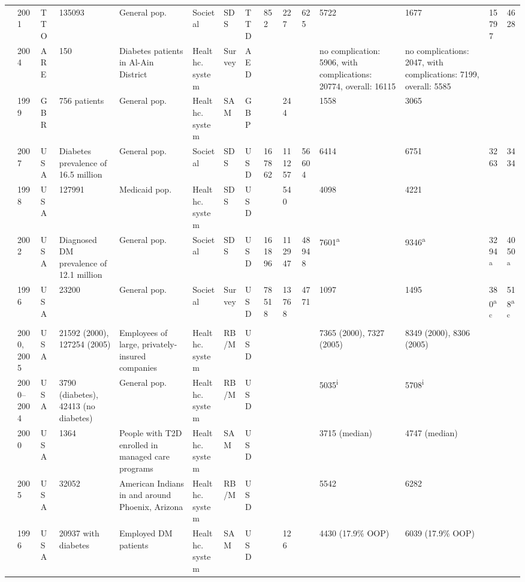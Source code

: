 {\begin{landscape}
\begin{tabularx}{\linewidth}{Z X X Z Z X X X X X X X X Y Y}
\textcite{Abdulkadri2009b} & 2001 & TTO & 135093 & General pop. & Societal & SDS & TTD & 852 & 227 & 625 & 5722 & 1677 & 15797 & 4628 \\
\textcite{Al-Maskari2010c} & 2004 & ARE & 150 & Diabetes patients in Al-Ain District & Healthc. system & Survey & AED &  &  &  & no complication: 5906, with complications:   20774, overall: 16115 & no complications: 2047, with complications:   7199, overall: 5585 &  &  \\
\textcite{Jonsson2002b} & 1999 & GBR & 756 patients & General pop. & Healthc. system & SAM & GBP &  & 244 &  & 1558 & 3065 &  &  \\
\textcite{Dall2010} & 2007 & USA & Diabetes prevalence of 16.5 million & General pop. & Societal & SDS & USD & 167862 & 111257 & 56604 & 6414 & 6751 & 3263 & 3434 \\
\textcite{Buescher2010} & 1998 & USA & 127991 & Medicaid pop. & Healthc. system & SDS & USD &  & 540 &  & 4098 & 4221 &  &  \\
\textcite{Dall2003a} & 2002 & USA & Diagnosed DM prevalence of 12.1 million & General pop. & Societal & SDS & USD & 161896 & 112947 & 48948 & 7601\textsuperscript{a} & 9346\textsuperscript{a} & 3294\textsuperscript{a} & 4050\textsuperscript{a} \\
\textcite{Druss2001} & 1996 & USA & 23200 & General pop. & Societal & Survey & USD & 78518 & 13768 & 4771 & 1097 & 1495 & 380\textsuperscript{ac} & 518\textsuperscript{ac} \\
\textcite{Durden2009b} & 2000, 2005 & USA & 21592 (2000), 127254 (2005) & Employees of large, privately-insured   companies & Healthc. system & RB/M & USD &  &  &  & 7365 (2000), 7327 (2005) & 8349 (2000), 8306 (2005) &  &  \\
\textcite{Trogdon2008a} & 2000--2004 & USA & 3790 (diabetes), 42413 (no diabetes) & General pop. & Healthc. system & RB/M & USD &  &  &  & 5035\textsuperscript{i} & 5708\textsuperscript{i} &  &  \\
\textcite{Brandle2003d} & 2000 & USA & 1364 & People with T2D enrolled in managed care   programs & Healthc. system & SAM & USD &  &  &  & 3715 (median) & 4747 (median) &  &  \\
\textcite{Oconnell2012} & 2005 & USA & 32052 & American Indians in and around Phoenix,   Arizona & Healthc. system & RB/M & USD &  &  &  & 5542 & 6282 &  &  \\
\textcite{Peele2002a} & 1996 & USA & 20937 with diabetes & Employed DM patients & Healthc. system & SAM & USD &  & 126 &  & 4430 (17.9\% \ac{OOP}) & 6039 (17.9\% \ac{OOP}) &  &  \\

\end{tabularx}
\end{landscape}}
